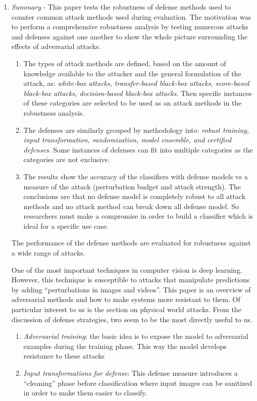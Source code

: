 \documentclass{article} %
\begin{document}
\begin{enumerate}
    \item \cite{Dong_2020_CVPR}
    \emph{Summary} - This paper tests the robustness of defense methods used to counter common attack methods used during evaluation. The motivation was to perform a comprehensive robustness analysis by testing numerous attacks and defenses against one another to show the whole picture surrounding the effects of adversarial attacks.
    \begin{enumerate}
        \item The types of attack methods are defined, based on the amount of knowledge available to the attacker and the general formulation of the attack, as: \emph{white-box attacks, transfer-based black-box attacks, score-based black-box attacks, decision-based black-box attacks}. Then specific instances of these categories are selected to be used as an attack methods in the robustness analysis.
        \item The defenses are similarly grouped by methodology into: \emph{robust training, input transformation, randomization, model ensemble, and certified defenses}. Some instances of defenses can fit into multiple categories as the categories are not exclusive.
        \item The results show the accuracy of the classifiers with defense models vs a measure of the attack (perturbation budget and attack strength). The conclusions are that no defense model is completely robust to all attack methods and no attack method can break down all defense model. So researchers must make a compromise in order to build a classifier which is ideal for a specific use case.
    \end{enumerate}
    The performance of the defense methods are evaluated for robustness against a wide range of attacks.
    
    \begin{item}
        \cite{AkharAdvars} 
        One of the most important techniques in computer vision is deep learning. However, this technique is susceptible to attacks that manipulate predictions by adding “perturbations in images and videos”. This paper is an overview of adversarial methods and how to make systems more resistant to them. Of particular interest to us is the section on physical world attacks. From the discussion of defense strategies, two seem to be the most directly useful to us.
        \begin{enumerate}
            \item \emph{Adversarial training}: the basic idea is to expose the model to adversarial examples during the training phase. This way the model develops resistance to these attacks
            \item \emph{Input transformations for defense}: This defense measure introduces a “cleaning” phase before classification where input images can be sanitized in order to make them easier to classify. 
        \end{enumerate}
    \end{item}
\end{enumerate}
\end{document}
